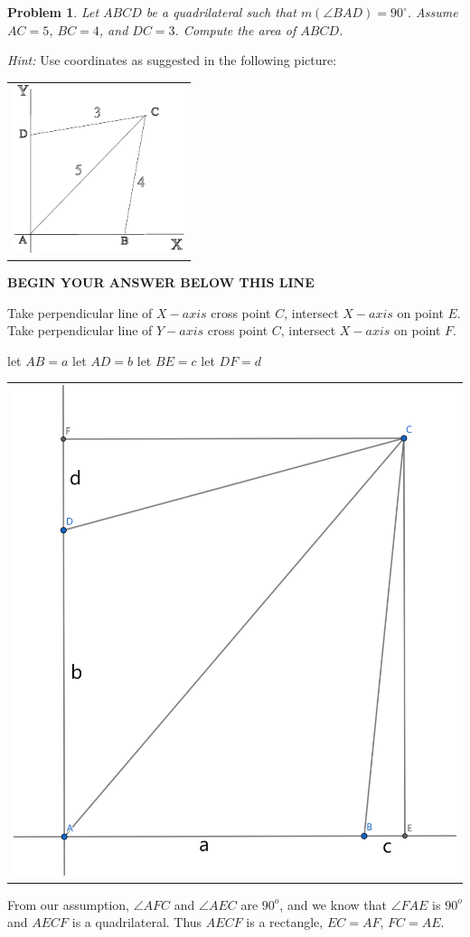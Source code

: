 \documentclass[letter,12pt]{article}
\newtheorem{problem}[main_theorem]{Problem}
\newcommand{\answerspacetop}{
	\begin{center}
		\textbf{BEGIN YOUR ANSWER BELOW THIS LINE} \\ \hrulefill
	\end{center}
}
\begin{document}
\begin{problem}
    Let $ABCD$ be a quadrilateral such that $m(\angle BAD) = 90^\circ$. Assume $AC = 5$, $BC = 4$, and $DC = 3$. Compute the area of $ABCD$.
\end{problem}
\textit{Hint:} Use coordinates as suggested in the following picture:
\begin{center}
\begin{tabular}{c}
\includegraphics[width=50mm]{problems1.eps} \\
\end{tabular}
\end{center}

\answerspacetop

Take perpendicular line of $X-axis$ cross point $C$, intersect $X-axis$ on point $E$.
Take perpendicular line of $Y-axis$ cross point $C$, intersect $X-axis$ on point $F$.

let $AB = a$
let $AD = b$
let $BE = c$
let $DF = d$

\begin{center}
	\begin{tabular}{c}
		\includegraphics[width=0.5\columnwidth]{Q6.png} \\
	\end{tabular}
\end{center}

From our assumption, $\angle AFC$ and $\angle AEC$ are $90^o$, and we know that $\angle FAE$ is $90^o$ and $AECF$ is a quadrilateral.
Thus $AECF$ is a rectangle, $EC = AF$, $FC = AE$.
\end{document}
